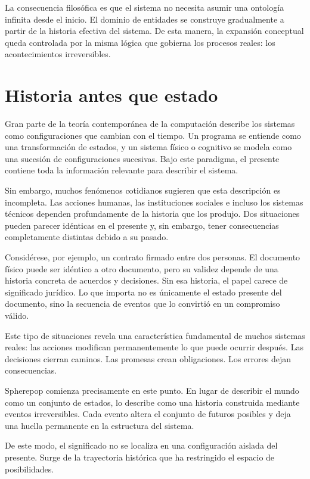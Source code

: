 \documentclass[12pt]{article}
\begin{document}
La consecuencia filosófica es que el sistema no necesita asumir una ontología infinita desde el inicio. El dominio de entidades se construye gradualmente a partir de la historia efectiva del sistema. De esta manera, la expansión conceptual queda controlada por la misma lógica que gobierna los procesos reales: los acontecimientos irreversibles.

\section{Historia antes que estado}

Gran parte de la teoría contemporánea de la computación describe los sistemas como configuraciones que cambian con el tiempo. Un programa se entiende como una transformación de estados, y un sistema físico o cognitivo se modela como una sucesión de configuraciones sucesivas. Bajo este paradigma, el presente contiene toda la información relevante para describir el sistema.

Sin embargo, muchos fenómenos cotidianos sugieren que esta descripción es incompleta. Las acciones humanas, las instituciones sociales e incluso los sistemas técnicos dependen profundamente de la historia que los produjo. Dos situaciones pueden parecer idénticas en el presente y, sin embargo, tener consecuencias completamente distintas debido a su pasado.

Considérese, por ejemplo, un contrato firmado entre dos personas. El documento físico puede ser idéntico a otro documento, pero su validez depende de una historia concreta de acuerdos y decisiones. Sin esa historia, el papel carece de significado jurídico. Lo que importa no es únicamente el estado presente del documento, sino la secuencia de eventos que lo convirtió en un compromiso válido.

Este tipo de situaciones revela una característica fundamental de muchos sistemas reales: las acciones modifican permanentemente lo que puede ocurrir después. Las decisiones cierran caminos. Las promesas crean obligaciones. Los errores dejan consecuencias.

Spherepop comienza precisamente en este punto. En lugar de describir el mundo como un conjunto de estados, lo describe como una historia construida mediante eventos irreversibles. Cada evento altera el conjunto de futuros posibles y deja una huella permanente en la estructura del sistema.

De este modo, el significado no se localiza en una configuración aislada del presente. Surge de la trayectoria histórica que ha restringido el espacio de posibilidades.
\end{document}
